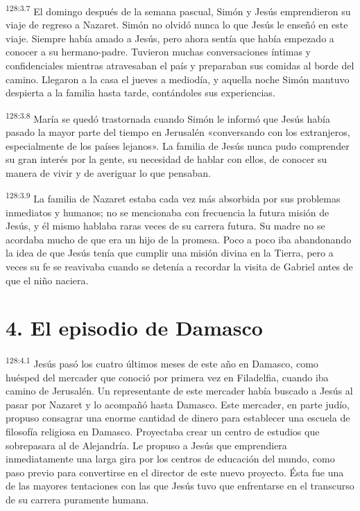 \par 
\textsuperscript{128:3.7} El domingo después de la semana pascual, Simón y Jesús emprendieron su viaje de regreso a Nazaret. Simón no olvidó nunca lo que Jesús le enseñó en este viaje. Siempre había amado a Jesús, pero ahora sentía que había empezado a conocer a su hermano-padre. Tuvieron muchas conversaciones íntimas y confidenciales mientras atravesaban el país y preparaban sus comidas al borde del camino. Llegaron a la casa el jueves a mediodía, y aquella noche Simón mantuvo despierta a la familia hasta tarde, contándoles sus experiencias.

\par 
\textsuperscript{128:3.8} María se quedó trastornada cuando Simón le informó que Jesús había pasado la mayor parte del tiempo en Jerusalén «conversando con los extranjeros, especialmente de los países lejanos». La familia de Jesús nunca pudo comprender su gran interés por la gente, su necesidad de hablar con ellos, de conocer su manera de vivir y de averiguar lo que pensaban.

\par 
\textsuperscript{128:3.9} La familia de Nazaret estaba cada vez más absorbida por sus problemas inmediatos y humanos; no se mencionaba con frecuencia la futura misión de Jesús, y él mismo hablaba raras veces de su carrera futura. Su madre no se acordaba mucho de que era un hijo de la promesa. Poco a poco iba abandonando la idea de que Jesús tenía que cumplir una misión divina en la Tierra, pero a veces su fe se reavivaba cuando se detenía a recordar la visita de Gabriel antes de que el niño naciera.

\section*{4. El episodio de Damasco}
\par 
\textsuperscript{128:4.1} Jesús pasó los cuatro últimos meses de este año en Damasco, como huésped del mercader que conoció por primera vez en Filadelfia, cuando iba camino de Jerusalén. Un representante de este mercader había buscado a Jesús al pasar por Nazaret y lo acompañó hasta Damasco. Este mercader, en parte judío, propuso consagrar una enorme cantidad de dinero para establecer una escuela de filosofía religiosa en Damasco. Proyectaba crear un centro de estudios que sobrepasara al de Alejandría. Le propuso a Jesús que emprendiera inmediatamente una larga gira por los centros de educación del mundo, como paso previo para convertirse en el director de este nuevo proyecto. Ésta fue una de las mayores tentaciones con las que Jesús tuvo que enfrentarse en el transcurso de su carrera puramente humana.

